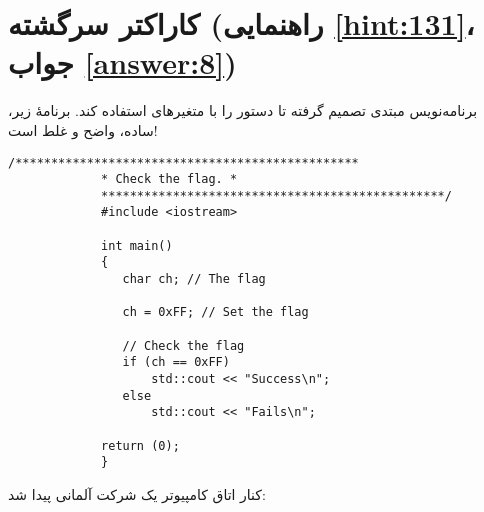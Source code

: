 \section[کاراکتر سرگشته]{کاراکتر سرگشته \protect{} (راهنمایی \ref{hint:131}، جواب \ref{answer:8})}
برنامه‌نویس مبتدی تصمیم گرفته تا دستور  را با متغیرهای  استفاده کند. برنامهٔ زیر، ساده، واضح و غلط است!

\begin{LTR}
        \begin{lstlisting}[style=C++Style]
             /************************************************
             * Check the flag. *
             ************************************************/
             #include <iostream>

             int main()
             {
             	char ch; // The flag

             	ch = 0xFF; // Set the flag

             	// Check the flag
             	if (ch == 0xFF)
             		std::cout << "Success\n";
             	else
             		std::cout << "Fails\n";

             return (0);
             }
        \end{lstlisting}
\end{LTR}

\begin{tcolorbox}
    \centering
    کنار اتاق کامپیوتر یک شرکت آلمانی پیدا شد:


    \small{}
\end{tcolorbox}
